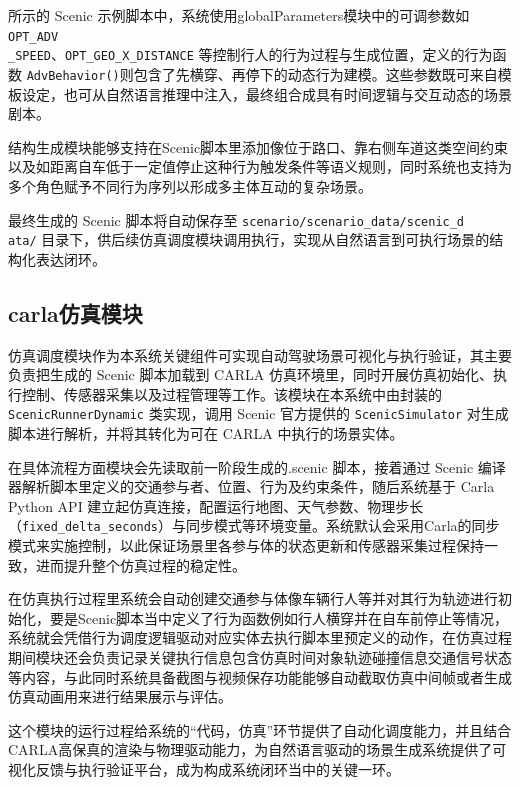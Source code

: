 所示的 Scenic 示例脚本中，系统使用globalParameters模块中的可调参数如
\texttt{OPT\_ADV\\ \_SPEED}、\texttt{OPT\_GEO\_X\_DISTANCE} 等控制行人的行为过程与生成位置，定义的行为函数 \texttt{AdvBehavior()}则包含了先横穿、再停下的动态行为建模。这些参数既可来自模板设定，也可从自然语言推理中注入，最终组合成具有时间逻辑与交互动态的场景剧本。

结构生成模块能够支持在Scenic脚本里添加像位于路口、靠右侧车道这类空间约束以及如距离自车低于一定值停止这种行为触发条件等语义规则，同时系统也支持为多个角色赋予不同行为序列以形成多主体互动的复杂场景。

最终生成的 Scenic 脚本将自动保存至 \texttt{scenario/scenario\_data/scenic\_d\\ata/} 目录下，供后续仿真调度模块调用执行，实现从自然语言到可执行场景的结构化表达闭环。

\subsection{carla仿真模块}

仿真调度模块作为本系统关键组件可实现自动驾驶场景可视化与执行验证，其主要负责把生成的 Scenic 脚本加载到 CARLA 仿真环境里，同时开展仿真初始化、执行控制、传感器采集以及过程管理等工作。该模块在本系统中由封装的 \texttt{ScenicRunnerDynamic} 类实现，调用 Scenic 官方提供的 \texttt{ScenicSimulator} 对生成脚本进行解析，并将其转化为可在 CARLA 中执行的场景实体。

在具体流程方面模块会先读取前一阶段生成的.scenic 脚本，接着通过 Scenic 编译器解析脚本里定义的交通参与者、位置、行为及约束条件，随后系统基于 Carla Python API 建立起仿真连接，配置运行地图、天气参数、物理步长（\texttt{fixed\_delta\_seconds}）与同步模式等环境变量。系统默认会采用Carla的同步模式来实施控制，以此保证场景里各参与体的状态更新和传感器采集过程保持一致，进而提升整个仿真过程的稳定性。

在仿真执行过程里系统会自动创建交通参与体像车辆行人等并对其行为轨迹进行初始化，要是Scenic脚本当中定义了行为函数例如行人横穿并在自车前停止等情况，系统就会凭借行为调度逻辑驱动对应实体去执行脚本里预定义的动作，在仿真过程期间模块还会负责记录关键执行信息包含仿真时间对象轨迹碰撞信息交通信号状态等内容，与此同时系统具备截图与视频保存功能能够自动截取仿真中间帧或者生成仿真动画用来进行结果展示与评估。

这个模块的运行过程给系统的“代码，仿真”环节提供了自动化调度能力，并且结合CARLA高保真的渲染与物理驱动能力，为自然语言驱动的场景生成系统提供了可视化反馈与执行验证平台，成为构成系统闭环当中的关键一环。

